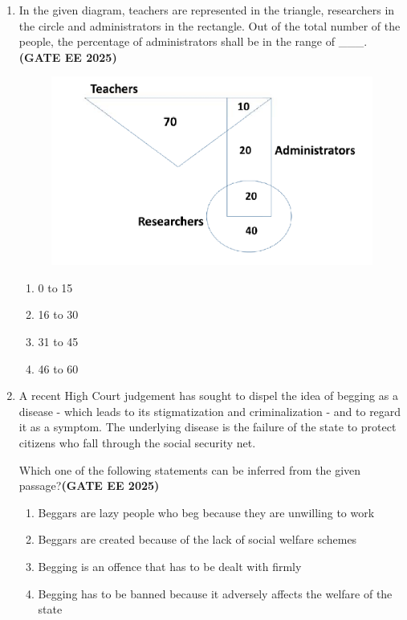 \documentclass[journal,12pt,onecolumn]{IEEEtran}
\theoremstyle{remark}
\begin{document}
\begin{enumerate}
\item In the given diagram, teachers are represented in the triangle, researchers in the circle and administrators in the rectangle. Out of the total number of the people, the percentage of administrators shall be in the range of \_\_\_.\hfill \textbf{(GATE EE 2025)}
\begin{figure}[H]
    \centering
    \includegraphics[width=0.5\linewidth]{figs/fig1.png}
    \caption{ }
    \label{fig1}
\end{figure}
\begin{enumerate}
\item  0 to 15
\item  16 to 30
\item  31 to 45
\item  46 to 60
\end{enumerate}

\item A recent High Court judgement has sought to dispel the idea of begging as a disease - which leads to its stigmatization and criminalization - and to regard it as a symptom. The underlying disease is the failure of the state to protect citizens who fall through the social security net.

Which one of the following statements can be inferred from the given passage?\hfill \textbf{(GATE EE 2025)}

\begin{enumerate}
\item  Beggars are lazy people who beg because they are unwilling to work
\item  Beggars are created because of the lack of social welfare schemes
\item  Begging is an offence that has to be dealt with firmly
\item  Begging has to be banned because it adversely affects the welfare of the state
\end{enumerate}


\end{enumerate}
\end{document}
